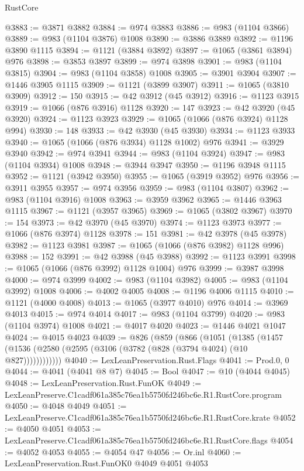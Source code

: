 \begin{lexlean}{RustCore}
\begin{coremodule}
@3883 := @3871 @3882
@3884 := @974 @3883
@3886 := @983 (@1104 @3866)
@3889 := @983 (@1104 @3876) @1008
@3890 := @3886 @3889
@3892 := @1196 @3890 @1115
@3894 := @1121 (@3884 @3892)
@3897 := @1065 (@3861 @3894) @976
@3898 := @3853 @3897
@3899 := @974 @3898
@3901 := @983 (@1104 @3815)
@3904 := @983 (@1104 @3858) @1008
@3905 := @3901 @3904
@3907 := @1446 @3905 @1115
@3909 := @1121 (@3899 @3907)
@3911 := @1065 (@3810 @3909)
@3912 := 150
@3915 := @42 @3912 (@45 @3912)
@3916 := @1123 @3915
@3919 := @1066 (@876 @3916) @1128
@3920 := 147
@3923 := @42 @3920 (@45 @3920)
@3924 := @1123 @3923
@3929 := @1065 (@1066 (@876 @3924) @1128 @994)
@3930 := 148
@3933 := @42 @3930 (@45 @3930)
@3934 := @1123 @3933
@3940 := @1065 (@1066 (@876 @3934) @1128 @1002) @976
@3941 := @3929 @3940
@3942 := @974 @3941
@3944 := @983 (@1104 @3924)
@3947 := @983 (@1104 @3934) @1008
@3948 := @3944 @3947
@3950 := @1196 @3948 @1115
@3952 := @1121 (@3942 @3950)
@3955 := @1065 (@3919 @3952) @976
@3956 := @3911 @3955
@3957 := @974 @3956
@3959 := @983 (@1104 @3807)
@3962 := @983 (@1104 @3916) @1008
@3963 := @3959 @3962
@3965 := @1446 @3963 @1115
@3967 := @1121 (@3957 @3965)
@3969 := @1065 (@3802 @3967)
@3970 := 154
@3973 := @42 @3970 (@45 @3970)
@3974 := @1123 @3973
@3977 := @1066 (@876 @3974) @1128
@3978 := 151
@3981 := @42 @3978 (@45 @3978)
@3982 := @1123 @3981
@3987 := @1065 (@1066 (@876 @3982) @1128 @996)
@3988 := 152
@3991 := @42 @3988 (@45 @3988)
@3992 := @1123 @3991
@3998 := @1065 (@1066 (@876 @3992) @1128 @1004) @976
@3999 := @3987 @3998
@4000 := @974 @3999
@4002 := @983 (@1104 @3982)
@4005 := @983 (@1104 @3992) @1008
@4006 := @4002 @4005
@4008 := @1196 @4006 @1115
@4010 := @1121 (@4000 @4008)
@4013 := @1065 (@3977 @4010) @976
@4014 := @3969 @4013
@4015 := @974 @4014
@4017 := @983 (@1104 @3799)
@4020 := @983 (@1104 @3974) @1008
@4021 := @4017 @4020
@4023 := @1446 @4021 @1047
@4024 := @4015 @4023
@4039 := @826
    (@859
      (@866
        (@1051
          (@1385 (@1457 (@1536 (@2580 (@2595 (@3106 (@3782 (@828 (@3794 @4024) (@10 @827))))))))))))
@4040 := LexLeanPreservation.Rust.Flags
@4041 := Prod.{0, 0}
@4044 := @4041 (@4041 @8 @7)
@4045 := Bool
@4047 := @10 (@4044 @4045)
@4048 := LexLeanPreservation.Rust.FunOK
@4049 := LexLeanPreserve.C1cadf061a385c76ea1b5750fd246bc6e.R1.RustCore.program
@4050 := @4048 @4049
@4051 := LexLeanPreserve.C1cadf061a385c76ea1b5750fd246bc6e.R1.RustCore.krate
@4052 := @4050 @4051
@4053 := LexLeanPreserve.C1cadf061a385c76ea1b5750fd246bc6e.R1.RustCore.flags
@4054 := @4052 @4053
@4055 := @4054 @47
@4056 := Or.inl
@4060 := LexLeanPreservation.Rust.FunOK0 @4049 @4051 @4053

\end{coremodule}
\end{lexlean}
